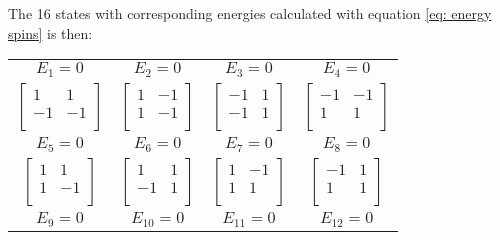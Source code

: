 \documentclass[11pt,a4wide]{article}
\begin{document}
The 16 states with corresponding energies calculated with equation \ref{eq: energy spins} is then: \\
\begin{tabular}{cccc}
$E_1 = 0$ & $E_2 = 0$ & $E_3 = 0$& $E_4 = 0$ \\ 
$\left[ \begin{array}{cc} 1 & 1 \\
                             	    -1  & -1 \\
\end{array} \right]$ & 
$
\left[ \begin{array}{cc} 1 & -1 \\
                             	    1  & -1 \\
\end{array} \right]$ &
$
\left[ \begin{array}{cc} -1 & 1 \\
                             	    -1  & 1 \\
\end{array} \right]$ & 
$
\left[ \begin{array}{cc} -1 & -1 \\
                             	    1  & 1 \\
\end{array} \right] $ \\
$E_5 = 0$ & $E_6 = 0$ & $E_7 = 0$& $E_8 = 0$ \\ 
$
\left[ \begin{array}{cc} 1 & 1 \\
                             	    1  & -1 \\
\end{array} \right]$ &
$
\left[ \begin{array}{cc} 1 & 1 \\
                             	    -1  & 1 \\
\end{array} \right]$ &
$
\left[ \begin{array}{cc} 1 & -1 \\
                             	    1  & 1 \\
\end{array} \right]$ &
$
\left[ \begin{array}{cc} -1 & 1 \\
                             	    1  & 1 \\
\end{array} \right]$ \\
$E_9 = 0$ & $E_{10} = 0$ & $E_{11} = 0$& $E_{12} = 0$ \\ 

\end{tabular}
\end{document}
